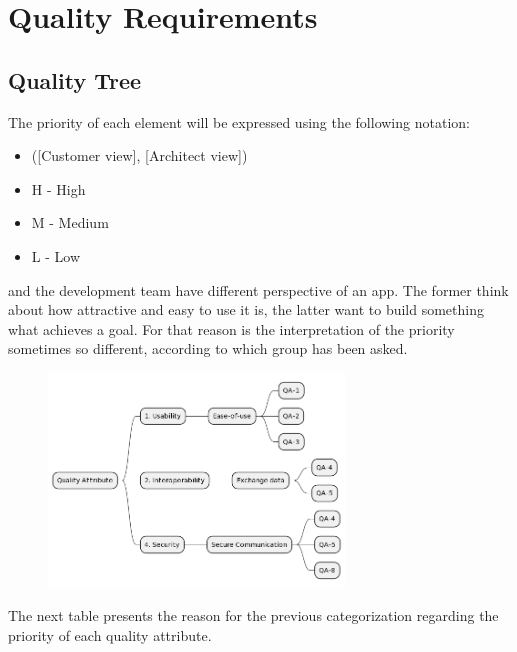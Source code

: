 \section{Quality Requirements}

\subsection{Quality Tree}

The priority of each element will be expressed using the following notation:

\begin{itemize}
    \item ([Customer view], [Architect view])
    \item H - High
    \item M - Medium
    \item L - Low
\end{itemize}

 and the development team have different perspective of an app. The former think about how attractive and easy to use
it is, the latter want to build something what achieves a goal. For that reason is the interpretation of the priority sometimes
so different, according to which group has been asked.

\begin{figure}[H]
    \centering
    \includegraphics[width=0.7\textwidth]{assets/quality_tree.png}
    \label{fig:quality_tree}
\end{figure}

The next table presents the reason for the previous categorization regarding the priority of each quality attribute.

